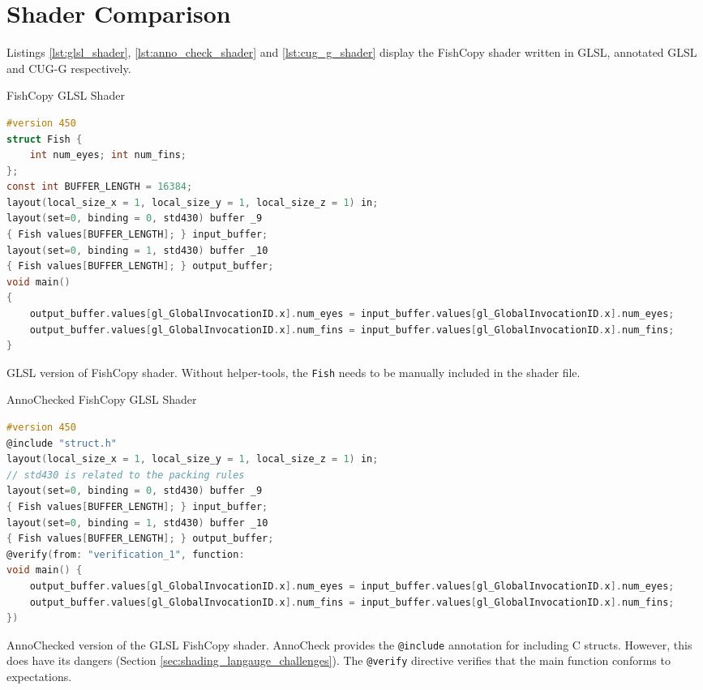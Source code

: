 \documentclass[a4paper,12pt,twoside,openright]{report}
\begin{document}
\section{Shader Comparison}

\label{sec:shader_comparison}

Listings \ref{lst:glsl_shader}, \ref{lst:anno_check_shader} and
\ref{lst:cug_g_shader} display the FishCopy shader written in GLSL, annotated
GLSL and CUG-G respectively.

\begin{lstfloat}
\begin{center}
FishCopy GLSL Shader
\end{center}
\begin{lstlisting}[language=C]
#version 450
struct Fish {
    int num_eyes; int num_fins;
};
const int BUFFER_LENGTH = 16384;
layout(local_size_x = 1, local_size_y = 1, local_size_z = 1) in;
layout(set=0, binding = 0, std430) buffer _9
{ Fish values[BUFFER_LENGTH]; } input_buffer;
layout(set=0, binding = 1, std430) buffer _10
{ Fish values[BUFFER_LENGTH]; } output_buffer;
void main()
{
    output_buffer.values[gl_GlobalInvocationID.x].num_eyes = input_buffer.values[gl_GlobalInvocationID.x].num_eyes;
    output_buffer.values[gl_GlobalInvocationID.x].num_fins = input_buffer.values[gl_GlobalInvocationID.x].num_fins;
}
\end{lstlisting}
\caption{GLSL version of FishCopy shader. Without helper-tools, the
\texttt{Fish} needs to be manually included in the shader file.}
\label{lst:glsl_shader}
\end{lstfloat}

\begin{lstfloat}
\begin{center}
AnnoChecked FishCopy GLSL Shader
\end{center}
\begin{lstlisting}[language=C]
#version 450
@include "struct.h"
layout(local_size_x = 1, local_size_y = 1, local_size_z = 1) in;
// std430 is related to the packing rules
layout(set=0, binding = 0, std430) buffer _9
{ Fish values[BUFFER_LENGTH]; } input_buffer;
layout(set=0, binding = 1, std430) buffer _10
{ Fish values[BUFFER_LENGTH]; } output_buffer;
@verify(from: "verification_1", function:
void main() {
    output_buffer.values[gl_GlobalInvocationID.x].num_eyes = input_buffer.values[gl_GlobalInvocationID.x].num_eyes;
    output_buffer.values[gl_GlobalInvocationID.x].num_fins = input_buffer.values[gl_GlobalInvocationID.x].num_fins;
})
\end{lstlisting}
\caption{AnnoChecked version of the GLSL FishCopy shader. AnnoCheck provides
the \texttt{@include} annotation for including C structs. However, this does
have its dangers (Section \ref{sec:shading_langauge_challenges}). The \texttt{@verify} directive
verifies that the main function conforms to expectations.}
\label{lst:anno_check_shader}
\end{lstfloat}
\end{document}
